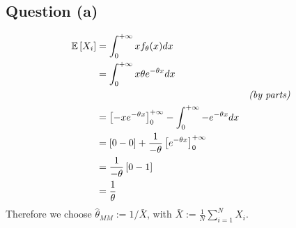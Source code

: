 \documentclass[12pt]{article}
\begin{document}
\subsection{Question (a)}
\begin{align*}
    \mathbb{E} \left[ X_i \right]
     & = \int_{0}^{+ \infty} x f_\theta (x) dx                                                                      \\
     & = \int_{0}^{+ \infty} x \theta e^{-\theta x} dx                                                              \\
     &                                                                                        & \textit{(by parts)} \\
     & = \left[ -x e^{-\theta x}\right]_{0}^{+\infty} - \int_{0}^{+ \infty} -e^{-\theta x} dx                       \\
     & = \left[ 0-0 \right] + \frac{1}{-\theta} \left[e^{-\theta x}\right]_{0}^{+ \infty}                           \\
     & = \frac{1}{-\theta} \left[0 - 1\right]                                                                       \\
     & = \frac{1}{\theta}                                                                                           \\
\end{align*}
Therefore we choose \(\hat\theta_{MM} := 1/\bar{X}\), with \(\bar{X} := \frac{1}{N} \sum_{i=1}^{N}X_i\).
\end{document}
